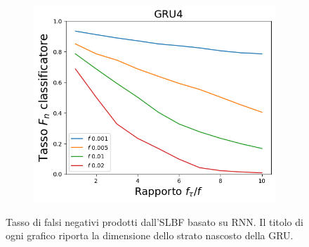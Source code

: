 \documentclass[../../main.tex]{subfiles}
\begin{document}
\begin{figure}[H]
\begin{subfigure}[b]{0.49\textwidth}
            \caption{}
            \label{fig:SLBFFNR_GRU8}
        \end{subfigure}
        \begin{subfigure}[b]{0.49\textwidth}
            \centering
            \includegraphics[width = \textwidth]{immagini/7/SLBF/GRU4_FNR.png}
            \caption{}
            \label{fig:SLBFFNR_GRU4}
        \end{subfigure}
        \caption{Tasso di falsi negativi prodotti dall'SLBF basato su RNN. Il titolo di ogni grafico riporta la dimensione dello strato nascosto della GRU.}
        \label{fig:SLBFFNR_GRU}
    \end{figure}
\end{document}
